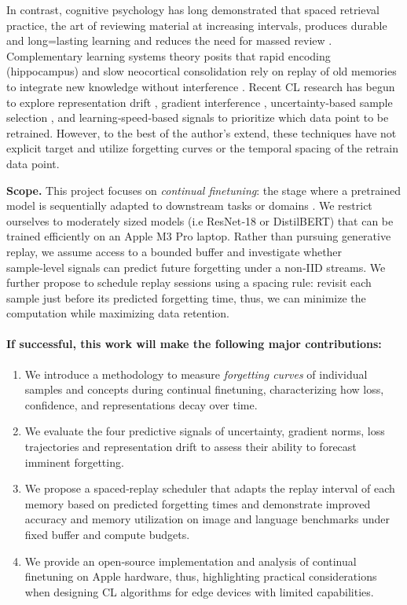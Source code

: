 \documentclass{article}
\begin{document}
In contrast, cognitive psychology has long demonstrated that spaced retrieval practice, the art of reviewing material at increasing intervals, produces durable and long=lasting learning and reduces the need for massed review \citep{cepeda2008spacing}.  Complementary learning systems theory posits that rapid encoding (hippocampus) and slow neocortical consolidation rely on replay of old memories to integrate new knowledge without interference \citep{mcclelland1995cls}.  Recent CL research has begun to explore representation drift \citep{caccia2022ace, theofilou2025stabledrift}, gradient interference \citep{aljundi2019mir}, uncertainty\mbox{‑}based sample selection \citep{serra2025uncertainty}, and learning\mbox{‑}speed\mbox{‑}based signals \citep{hacochen2025sbs} to prioritize which data point to be retrained.  However, to the best of the author's extend, these techniques have not explicit target and utilize forgetting curves or the temporal spacing of the retrain data point.

\textbf{Scope.}  
This project focuses on \emph{continual finetuning}: the stage where a pretrained model is sequentially adapted to downstream tasks or domains \citep{wang2024comprehensive}.  We restrict ourselves to moderately sized models (i.e ResNet\mbox{‑}18 or DistilBERT) that can be trained efficiently on an Apple M3 Pro laptop.  Rather than pursuing generative replay, we assume access to a bounded buffer and investigate whether sample\mbox{‑}level signals can predict future forgetting under a non\mbox{‑}IID streams.  We further propose to schedule replay sessions using a spacing rule: revisit each sample just before its predicted forgetting time, thus, we can minimize the computation while maximizing data retention.

\paragraph{If successful, this work will make the following major contributions:}
\begin{enumerate}
    \item We introduce a methodology to measure \emph{forgetting curves} of individual samples and concepts during continual finetuning, characterizing how loss, confidence, and representations decay over time.
    \item We evaluate the four predictive signals of uncertainty, gradient norms, loss trajectories and representation drift to assess their ability to forecast imminent forgetting.
    \item We propose a spaced\mbox{‑}replay scheduler that adapts the replay interval of each memory based on predicted forgetting times and demonstrate improved accuracy and memory utilization on image and language benchmarks under fixed buffer and compute budgets.
    \item We provide an open\mbox{‑}source implementation and analysis of continual finetuning on Apple hardware, thus, highlighting practical considerations when designing CL algorithms for edge devices with limited capabilities.
\end{enumerate}
\end{document}
